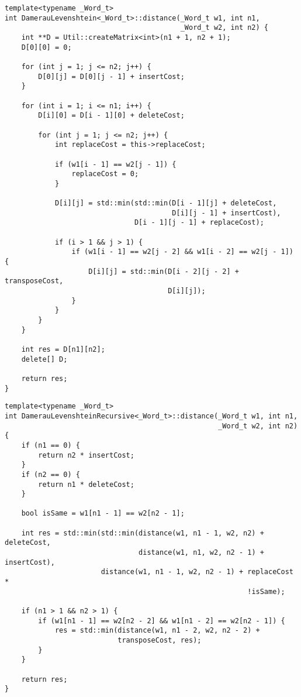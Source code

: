 \noindent\begin{minipage}{\textwidth}
\begin{lstlisting}[caption=Расстояние Дамерау-Левенштейна (матричная реализация)]
template<typename _Word_t>
int DamerauLevenshtein<_Word_t>::distance(_Word_t w1, int n1,
                                          _Word_t w2, int n2) {
    int **D = Util::createMatrix<int>(n1 + 1, n2 + 1);
    D[0][0] = 0;

    for (int j = 1; j <= n2; j++) {
        D[0][j] = D[0][j - 1] + insertCost;
    }

    for (int i = 1; i <= n1; i++) {
        D[i][0] = D[i - 1][0] + deleteCost;

        for (int j = 1; j <= n2; j++) {
            int replaceCost = this->replaceCost;

            if (w1[i - 1] == w2[j - 1]) {
                replaceCost = 0;
            }

            D[i][j] = std::min(std::min(D[i - 1][j] + deleteCost,
                                        D[i][j - 1] + insertCost),
                               D[i - 1][j - 1] + replaceCost);

            if (i > 1 && j > 1) {
                if (w1[i - 1] == w2[j - 2] && w1[i - 2] == w2[j - 1]) {
                    D[i][j] = std::min(D[i - 2][j - 2] + transposeCost,
                                       D[i][j]);
                }
            }
        }
    }

    int res = D[n1][n2];
    delete[] D;

    return res;
}
\end{lstlisting}
\end{minipage}

\noindent\begin{minipage}{\textwidth}
\begin{lstlisting}[caption=Расстояние Дамерау-Левенштейна (рекурсивная реализация)]
template<typename _Word_t>
int DamerauLevenshteinRecursive<_Word_t>::distance(_Word_t w1, int n1,
                                                   _Word_t w2, int n2) {
    if (n1 == 0) {
        return n2 * insertCost;
    }
    if (n2 == 0) {
        return n1 * deleteCost;
    }

    bool isSame = w1[n1 - 1] == w2[n2 - 1];

    int res = std::min(std::min(distance(w1, n1 - 1, w2, n2) + deleteCost,
                                distance(w1, n1, w2, n2 - 1) + insertCost),
                       distance(w1, n1 - 1, w2, n2 - 1) + replaceCost *
                                                          !isSame);

    if (n1 > 1 && n2 > 1) {
        if (w1[n1 - 1] == w2[n2 - 2] && w1[n1 - 2] == w2[n2 - 1]) {
            res = std::min(distance(w1, n1 - 2, w2, n2 - 2) +
                           transposeCost, res);
        }
    }

    return res;
}
\end{lstlisting}
\end{minipage}

